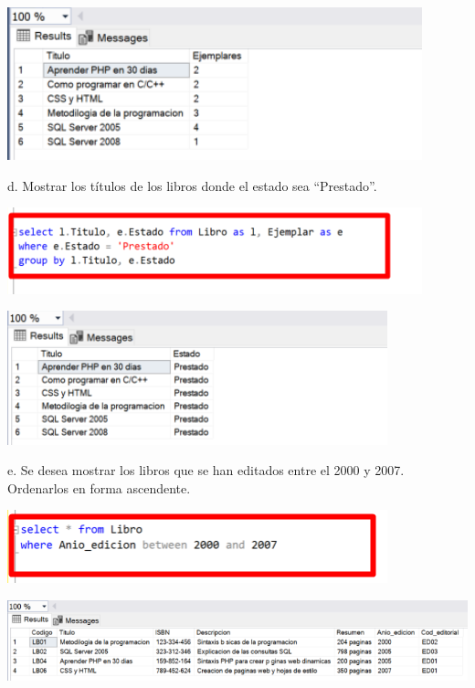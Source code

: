 \documentclass[12pt,letterpaper]{article}
\begin{document}
\begin{center}
    \includegraphics[width=12cm]{img/13.png}  
\end{center}
d. Mostrar los títulos de los libros donde el estado sea “Prestado”.
\begin{center}
    \includegraphics[width=12cm]{img/14.png}  
\end{center}
\begin{center}
    \includegraphics[width=11cm]{img/15.png}
    \vspace{1cm}    
\end{center}
e. Se desea mostrar los libros que se han editados entre el 2000 y 2007. Ordenarlos en
forma ascendente.
\begin{center}
    \includegraphics[width=11cm]{img/16.png}  
\end{center}
\begin{center}
    \includegraphics[width=15cm]{img/17.png}
    \vspace{1cm}  
\end{center}
\end{document}
